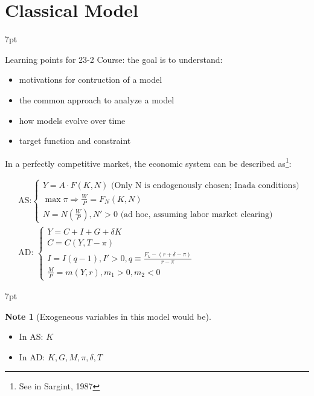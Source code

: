 \documentclass{article}
\providecommand{\tightlist}{
  \setlength{\itemsep}{0pt}
  \setlength{\parskip}{0pt}}
\newenvironment{blueblock}{
\def\FrameCommand{
  \hspace{1pt}
    {\color{DarkBlue}
    \vrule width 2pt}
    {\color{blueshade}
    \vrule width 4pt}
  \colorbox{blueshade}
}
\MakeFramed{
  \advance
  \hsize-
  \width
  \FrameRestore}
\noindent\hspace{-4.55pt}%
\begin{adjustwidth}{}{7pt}
\vspace{2pt}\vspace{2pt}
}
{\vspace{2pt}\end{adjustwidth}\endMakeFramed}
\newenvironment{greenblock}{%
\def\FrameCommand{%
  \hspace{1pt}%
    {\color{Green}%
    \vrule width 2pt}%
    {\color{greenshade}%
    \vrule width 4pt}%
  \colorbox{greenshade}%
}%
\MakeFramed{%
  \advance%
  \hsize-%
  \width%
  \FrameRestore}%
\noindent\hspace{-4.55pt}%
\begin{adjustwidth}{}{7pt}%
\vspace{2pt}\vspace{2pt}%
}
{%
\vspace{2pt}\end{adjustwidth}\endMakeFramed%
}
\newtheorem{note}{Note}
\begin{document}
\newpage
\section{Classical Model}\label{classical-model}


\begin{greenblock}
Learning points for 23-2 Course: the goal is to understand:

\begin{itemize}
\tightlist
  \item motivations for contruction of a model
  \item the common approach to analyze a model
  \item how models evolve over time
  \item target function and constraint
\end{itemize}

\end{greenblock}

In a perfectly competitive market, the economic system can be described as\footnote{See in Sargint, 1987}: 

\begin{align}
&\text{AS:}
\begin{cases}
Y=A\cdot F(K,N)\text{ (Only N is endogenously chosen; Inada conditions)}
\\
\max \pi \Rightarrow \frac{W}{P}=F_{N}(K,N) \\
N=N(\frac{W}{P}),N'>0\text{ (ad hoc, assuming labor market clearing)}\end{cases}
\\
&\text{AD: }
\begin{cases}
Y=C+I+G+\delta K \\
C=C(Y,T-\pi) \\
I=I(q-1), I'>0, q\equiv \frac{F_{k}-(r+\delta-\pi)}{r-\pi} \\
\frac{M}{P}=m(Y,r),m_{1}>0,m_{2}<0
\end{cases}
\end{align}

\begin{blueblock}
\begin{note}[Exogeneous variables in this model would be]
\end{note}
\begin{itemize}
\tightlist
  \item In AS: $K$
  \item In AD: $K, G, M, \pi, \delta, T$
\end{itemize}
\end{blueblock}
\end{document}
